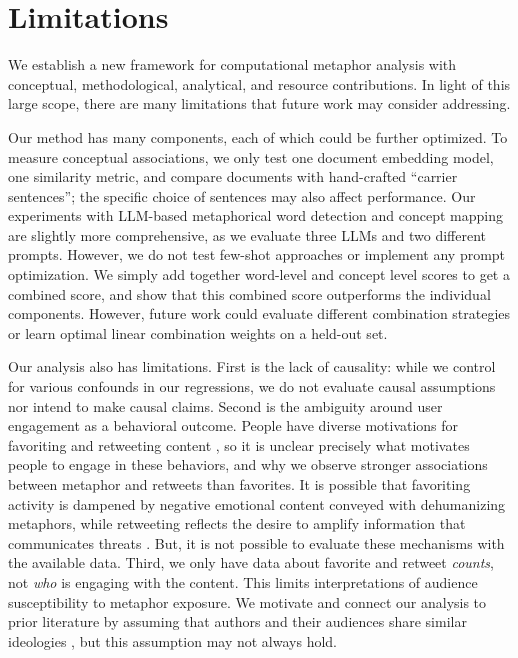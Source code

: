 \section{Limitations}

We establish a new framework for computational metaphor analysis with conceptual, methodological, analytical, and resource contributions. In light of this large scope, there are many limitations that future work may consider addressing. 

Our method has many components, each of which could be further optimized. To measure conceptual associations, we only test one document embedding model, one similarity metric, and compare documents with hand-crafted ``carrier sentences''; the specific choice of sentences may also affect performance. Our experiments with LLM-based metaphorical word detection and concept mapping are slightly more comprehensive, as we evaluate three LLMs and two different prompts. However, we do not test few-shot approaches or implement any prompt optimization. We simply add together word-level and concept level scores to get a combined score, and show that this combined score outperforms the individual components. However, future work could evaluate different combination strategies or learn optimal linear combination weights on a held-out set.


Our analysis also has limitations. First is the lack of causality: while we control for various confounds in our regressions, we do not evaluate causal assumptions nor intend to make causal claims. Second is the ambiguity around user engagement as a behavioral outcome. People have diverse motivations for favoriting and retweeting content \citep{meier2014more,boyd2010tweet}, so it is unclear precisely what motivates people to engage in these behaviors, and why we observe stronger associations between metaphor and retweets than favorites. 
It is possible that favoriting activity is dampened by negative emotional content conveyed with dehumanizing metaphors, while retweeting reflects the desire to amplify information that communicates threats \citep{mendelsohn2021modeling}. But, it is not possible to evaluate these mechanisms with the available data. Third, we only have data about favorite and retweet \textit{counts}, not \textit{who} is engaging with the content. This limits interpretations of audience susceptibility to metaphor exposure. We motivate and connect our analysis to prior literature by assuming that authors and their audiences share similar ideologies \citep{barbera2015tweeting}, but this assumption may not always hold. 

